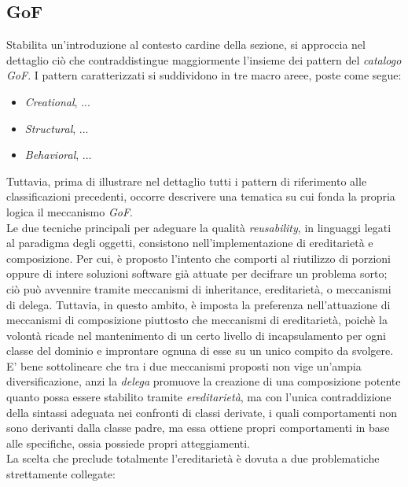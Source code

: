 \documentclass{article}
\begin{document}
\subsection*{GoF}
\large
Stabilita un'introduzione al contesto cardine della sezione, si approccia nel dettaglio ciò che contraddistingue maggiormente l'insieme dei pattern del \textit{catalogo GoF}. I pattern caratterizzati si suddividono in tre macro areee, poste come segue:
\begin{itemize}[label={-}]
    \itemsep0em
    \item \textit{Creational}, ...
    \item \textit{Structural}, ... 
    \item \textit{Behavioral}, ... 
\end{itemize} 
Tuttavia, prima di illustrare nel dettaglio tutti i pattern di riferimento alle classificazioni precedenti, occorre descrivere una tematica su cui fonda la propria logica il meccanismo \textit{GoF}.\vspace*{14pt}\\
Le due tecniche principali per adeguare la qualità \textit{reusability}, in linguaggi legati al paradigma degli oggetti, consistono nell'implementazione di ereditarietà e composizione. Per cui, è proposto l'intento che comporti al riutilizzo di porzioni oppure di intere soluzioni software già attuate per decifrare un problema sorto; ciò può avvennire tramite meccanismi di inheritance, ereditarietà, o meccanismi di delega. Tuttavia, in questo ambito, è imposta la preferenza nell'attuazione di meccanismi di composizione piuttosto che meccanismi di ereditarietà, poichè la volontà ricade nel mantenimento di un certo livello di incapsulamento per ogni classe del dominio e improntare ognuna di esse su un unico compito da svolgere.\vspace*{14pt}\\
E' bene sottolineare che tra i due meccanismi proposti non vige un'ampia diversificazione, anzi la \textit{delega} promuove la creazione di una composizione potente quanto possa essere stabilito tramite \textit{ereditarietà}, ma con l'unica contraddizione della sintassi adeguata nei confronti di classi derivate, i quali comportamenti non sono derivanti dalla classe padre, ma essa ottiene propri comportamenti in base alle specifiche, ossia possiede propri atteggiamenti.\vspace*{14pt}\\
La scelta che preclude totalmente l'ereditarietà è dovuta a due problematiche strettamente collegate:
\end{document}
